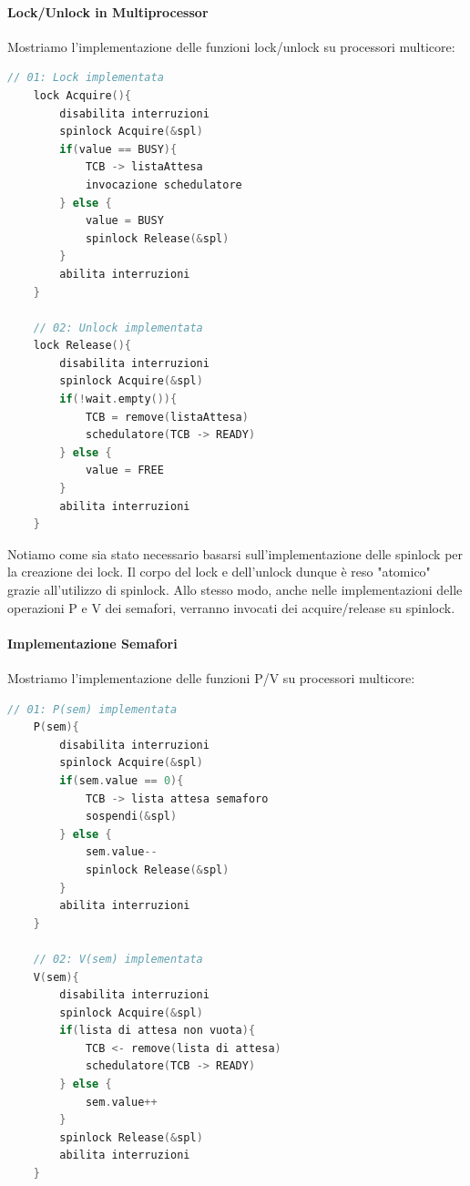 \documentclass{article}
\begin{document}
\paragraph{Lock/Unlock in Multiprocessor} Mostriamo l'implementazione delle funzioni lock/unlock su processori multicore:

\begin{lstlisting}[language = C]
    // 01: Lock implementata 
    lock Acquire(){
        disabilita interruzioni
        spinlock Acquire(&spl)
        if(value == BUSY){
            TCB -> listaAttesa
            invocazione schedulatore
        } else {
            value = BUSY
            spinlock Release(&spl)
        }
        abilita interruzioni
    }

    // 02: Unlock implementata
    lock Release(){
        disabilita interruzioni
        spinlock Acquire(&spl)
        if(!wait.empty()){
            TCB = remove(listaAttesa)
            schedulatore(TCB -> READY)
        } else {
            value = FREE
        }
        abilita interruzioni
    }
\end{lstlisting}

Notiamo come sia stato necessario basarsi sull'implementazione delle spinlock per la creazione dei lock. Il corpo del lock e dell'unlock dunque è reso "atomico" grazie
all'utilizzo di spinlock. Allo stesso modo, anche nelle implementazioni delle operazioni P e V dei semafori, verranno invocati dei acquire/release su spinlock.

\newpage

\paragraph{Implementazione Semafori} Mostriamo l'implementazione delle funzioni P/V su processori multicore:

\vspace*{15px}

\begin{lstlisting}[language = C]
    // 01: P(sem) implementata 
    P(sem){
        disabilita interruzioni
        spinlock Acquire(&spl)
        if(sem.value == 0){
            TCB -> lista attesa semaforo
            sospendi(&spl)
        } else {
            sem.value--
            spinlock Release(&spl)
        }
        abilita interruzioni
    }

    // 02: V(sem) implementata 
    V(sem){
        disabilita interruzioni
        spinlock Acquire(&spl)
        if(lista di attesa non vuota){
            TCB <- remove(lista di attesa)
            schedulatore(TCB -> READY)
        } else {
            sem.value++
        }
        spinlock Release(&spl)
        abilita interruzioni
    }
\end{lstlisting}
\end{document}
